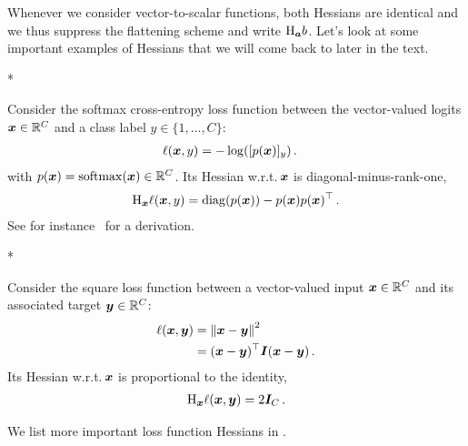 Whenever we consider vector-to-scalar functions, both Hessians are identical and we thus suppress the flattening scheme and write $\mathrm{H}_{{\bm{a}}}b$. Let's look at some important examples of Hessians that we will come back to later in the text.

\switchcolumn[1]*
\switchcolumn[0]

\begin{example}
  Consider the softmax cross-entropy loss function between the vector-valued logits ${\bm{x}} \in {\mathbb{R}}^C$ and a class label $y \in \{1, \dots, C\}$:
  \begin{align*}
    \ell({\bm{x}}, y)
    &=
      -\log([p({\bm{x}})]_y)\,.
  \end{align*}
  with $p({\bm{x}}) = \mathrm{softmax}({\bm{x}}) \in {\mathbb{R}}^C$.
  Its Hessian w.r.t.\,${\bm{x}}$ is diagonal-minus-rank-one,
  \begin{align*}
    \mathrm{H}_{{\bm{x}}} \ell({\bm{x}}, y)
    =
    \operatorname{diag}(p({\bm{x}})) - p({\bm{x}}) p({\bm{x}})^\top\,.
  \end{align*}
  See for instance~\cite{dangel2020modular} for a derivation.
\end{example}

\switchcolumn[1]*

\switchcolumn[0]
\begin{example}\label{ex:square_loss_hessian}
  Consider the square loss function between a vector-valued input ${\bm{x}} \in {\mathbb{R}}^C$ and its associated target ${\bm{y}} \in {\mathbb{R}}^C$:
  \begin{align*}
    \ell({\bm{x}}, {\bm{y}})
    &=
      \left\lVert
      {\bm{x}} - {\bm{y}}
      \right\rVert^2
      \\
      &=
      ({\bm{x}} - {\bm{y}})^{\top} {\bm{I}} ({\bm{x}} - {\bm{y}})\,.
  \end{align*}
  Its Hessian w.r.t.\,${\bm{x}}$ is proportional to the identity,
  \begin{align*}
    \mathrm{H}_{{\bm{x}}} \ell({\bm{x}}, {\bm{y}})
    =
    2 {\bm{I}}_C\,.
  \end{align*}
\end{example}

We list more important loss function Hessians in .

